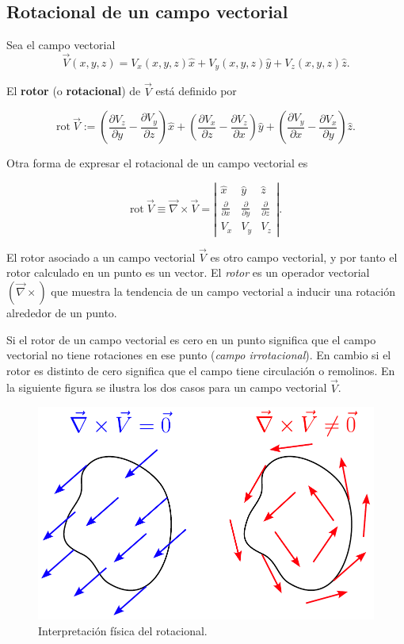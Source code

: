 \subsection*{Rotacional de un campo vectorial}

Sea el campo vectorial
$$\vec{V} (x,y,z) = V_x(x,y,z) \hat{x} + V_y(x,y,z) \hat{y} + V_z(x,y,z) \hat{z}.$$

El \textbf{rotor} (o \textbf{rotacional}) de $\vec{V}$ está definido por 
\begin{shaded}
 $$\mbox{rot} ~ \vec{V} := \left( \frac{\partial V_z}{\partial y} - \frac{\partial V_y}{\partial z} \right) \hat{x} + \left( \frac{\partial V_x}{\partial z} - \frac{\partial V_z}{\partial x} \right) \hat{y} + \left( \frac{\partial V_y}{\partial x} - \frac{\partial V_x}{\partial y} \right) \hat{z}.$$   
\end{shaded}

Otra forma de expresar el rotacional de un campo vectorial es
\begin{shaded}
$$\mbox{rot} ~ \vec{V} \equiv \vec{\nabla} \times \vec{V} = \left| \begin{array}{ccc}
\hat{x} & \hat{y} & \hat{z}  \\
\frac{\partial}{\partial x} & \frac{\partial}{\partial y} & \frac{\partial}{\partial z}  \\
V_x & V_y & V_z
\end{array} \right|.$$  
\end{shaded}

El rotor asociado a un campo vectorial $\vec{V}$ es otro campo vectorial, y por tanto el rotor calculado en un punto es un vector. El \textit{rotor} es un operador vectorial $(\vec{\nabla} \times)$ que muestra la tendencia de un campo vectorial a inducir una rotación alrededor de un punto.

Si el rotor de un campo vectorial es cero en un punto significa que el campo vectorial no tiene rotaciones en ese punto (\textit{campo irrotacional}). En cambio si el rotor es distinto de cero significa que el campo tiene circulación o remolinos. En la siguiente figura se ilustra los dos casos para un campo vectorial $\Vec{V}$.

\begin{figure}[H]
    \centering
    \includegraphics[scale = 0.52]{Figuras/Rotor.pdf}
    \caption{Interpretación física del rotacional.}
    \label{fig:rotor}
\end{figure}


